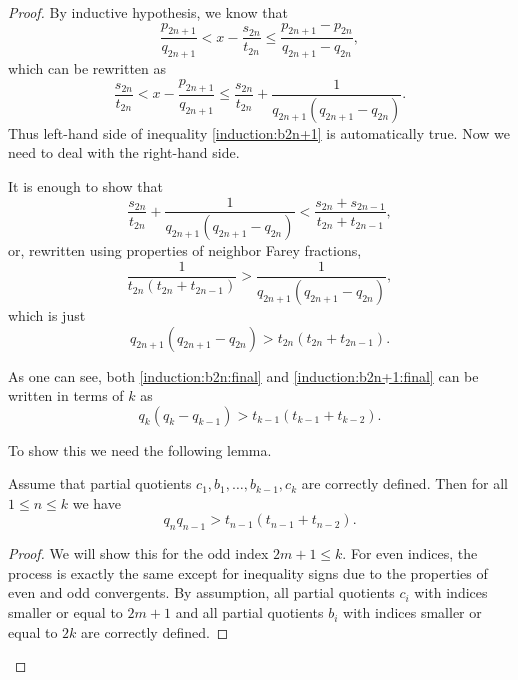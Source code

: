 \documentclass[10pt,a4paper]{amsart}
\begin{document}
\begin{proof}
By inductive hypothesis, we know that
$$
\frac{p_{2n+1}}{q_{2n+1}}  < x - \frac{s_{2n}}{t_{2n}} \leq \frac{p_{2n+1}-p_{2n}}{q_{2n+1}-q_{2n}},
$$
which can be rewritten as 
$$
\frac{s_{2n}}{t_{2n}}  < x - \frac{p_{2n+1}}{q_{2n+1}} \leq \frac{s_{2n}}{t_{2n}}+ \frac{1}{q_{2n+1}(q_{2n+1}-q_{2n})}.
$$
Thus left-hand side of inequality \eqref{induction:b2n+1} is automatically true. Now we need to deal with the right-hand side.

It is enough to show that
$$
\frac{s_{2n}}{t_{2n}}+ \frac{1}{q_{2n+1}(q_{2n+1}-q_{2n})} < \frac{s_{2n}+s_{2n-1}}{t_{2n}+t_{2n-1}},
$$
or, rewritten using properties of neighbor Farey fractions,
\begin{equation}
\frac{1}{t_{2n}(t_{2n}+t_{2n-1})} > \frac{1}{q_{2n+1}(q_{2n+1}-q_{2n})},
\end{equation}
which is just
\begin{equation}\label{induction:b2n+1:final}
q_{2n+1}(q_{2n+1}-q_{2n}) >t_{2n}(t_{2n}+t_{2n-1}).
\end{equation}


As one can see, both \eqref{induction:b2n:final} and \eqref{induction:b2n+1:final} can be written in terms of $k$ as
\begin{equation}\label{induction:bnbn:finalefinale}
q_k(q_k-q_{k-1}) > t_{k-1}(t_{k-1}+t_{k-2}).
\end{equation}


To show this we need the following lemma.
 
\begin{lemma}\label{lemma:quotient:qlarge}
Assume that partial quotients $c_1,b_1,\ldots,b_{k-1},c_k$ are correctly defined. Then for all $1\leq n \leq k$ we have 
\begin{equation}\label{inequality:lemma1}
q_{n}q_{n-1} > t_{n-1}(t_{n-1}+t_{n-2}) .
\end{equation}
\end{lemma}

\begin{proof}
We will show this for the odd index $2m+1\leq k$. For even indices, the process is exactly the same except for inequality signs due to the properties of even and odd convergents. By assumption, all partial quotients $c_i$ with indices smaller or equal to $2m+1$ and all partial quotients $b_i$ with indices smaller or equal to $2k$ are correctly defined.


\end{proof}
\end{proof}
\end{document}
